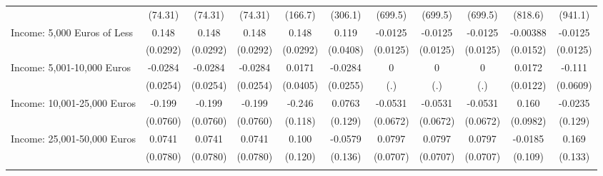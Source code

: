 {\begin{tabular}{l*{10}{c}}
            &     (74.31)         &     (74.31)         &     (74.31)         &     (166.7)         &     (306.1)         &     (699.5)         &     (699.5)         &     (699.5)         &     (818.6)         &     (941.1)         \\
\addlinespace
Income: 5,000 Euros of Less&       0.148\sym{***}&       0.148\sym{***}&       0.148\sym{***}&       0.148\sym{***}&       0.119\sym{**} &     -0.0125         &     -0.0125         &     -0.0125         &    -0.00388         &     -0.0125         \\
            &    (0.0292)         &    (0.0292)         &    (0.0292)         &    (0.0292)         &    (0.0408)         &    (0.0125)         &    (0.0125)         &    (0.0125)         &    (0.0152)         &    (0.0125)         \\
\addlinespace
Income: 5,001-10,000 Euros&     -0.0284         &     -0.0284         &     -0.0284         &      0.0171         &     -0.0284         &           0         &           0         &           0         &      0.0172         &      -0.111         \\
            &    (0.0254)         &    (0.0254)         &    (0.0254)         &    (0.0405)         &    (0.0255)         &         (.)         &         (.)         &         (.)         &    (0.0122)         &    (0.0609)         \\
\addlinespace
Income: 10,001-25,000 Euros&      -0.199\sym{**} &      -0.199\sym{**} &      -0.199\sym{**} &      -0.246\sym{*}  &      0.0763         &     -0.0531         &     -0.0531         &     -0.0531         &       0.160         &     -0.0235         \\
            &    (0.0760)         &    (0.0760)         &    (0.0760)         &     (0.118)         &     (0.129)         &    (0.0672)         &    (0.0672)         &    (0.0672)         &    (0.0982)         &     (0.129)         \\
\addlinespace
Income: 25,001-50,000 Euros&      0.0741         &      0.0741         &      0.0741         &       0.100         &     -0.0579         &      0.0797         &      0.0797         &      0.0797         &     -0.0185         &       0.169         \\
            &    (0.0780)         &    (0.0780)         &    (0.0780)         &     (0.120)         &     (0.136)         &    (0.0707)         &    (0.0707)         &    (0.0707)         &     (0.109)         &     (0.133)         \\
\addlinespace

\end{tabular}}
